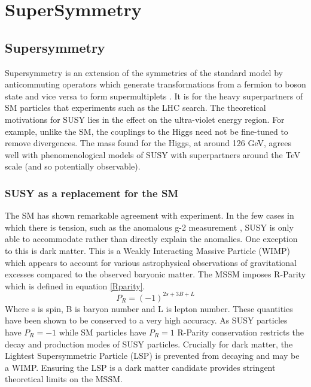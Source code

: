 
\chapter{SuperSymmetry} %

\label{Chapter4} %



\section{Supersymmetry}

Supersymmetry is an extension of the symmetries of the standard model by anticommuting operators which generate transformations from a fermion to boson state and vice versa to form supermultiplets \cite{susyintro}. It is for the heavy superpartners of SM particles that experiments such as the LHC search. The theoretical motivations for SUSY lies in the effect on the ultra-violet energy region. For example, unlike the SM, the couplings to the Higgs need not be fine-tuned to remove divergences. The mass found for the Higgs, at around 126 GeV, agrees well with phenomenological models of SUSY with superpartners around the TeV scale (and so potentially observable)\cite{susyhiggs}. 
\subsection{SUSY as a replacement for the SM}
The SM has shown remarkable agreement with experiment. In the few cases in which there is tension, such as the anomalous g-2 measurement \cite{gm2}, SUSY is only able to accommodate rather than directly explain the anomalies. One exception to this is dark matter. This is a Weakly Interacting Massive Particle (WIMP) which appears to account for various astrophysical observations of gravitational excesses compared to the observed baryonic matter\cite{dm}. The MSSM imposes R-Parity which is defined in equation \ref{Rparity}. 
\begin{equation}
\label{Rparity}
P_R=(-1)^{2s+3B+L}
\end{equation}
Where s is spin, B is baryon number and L is lepton number. These quantities have been shown to be conserved to a very high accuracy. As SUSY particles have $P_R=-1$ while SM particles have $P_R=1$ R-Parity conservation restricts the decay and production modes of SUSY particles\cite{susywimp}. Crucially for dark matter, the Lightest Supersymmetric Particle (LSP) is prevented from decaying and may be a WIMP. Ensuring the LSP is a dark matter candidate provides stringent theoretical limits on the MSSM.

